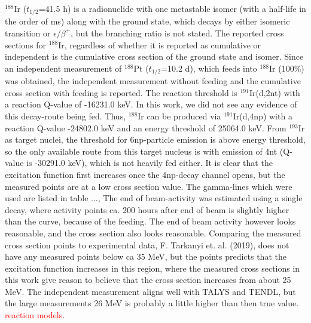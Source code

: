 \subsubsection{}
$^{188}$Ir ($t_{1/2}$=41.5 h) is a radionuclide with one metastable isomer (with a half-life in the order of ms) along with the ground state, which decays by either isomeric transition or $\epsilon/\beta^+$, but the branching ratio is not stated. The reported cross sections for $^{188}$Ir, regardless of whether it is reported as cumulative or independent is the cumulative cross section of the ground state and isomer. Since an independent measurement of $^{188}$Pt ($t_{1/2}$=10.2 d), which feeds into $^{188}$Ir (100\%) was obtained, the independent measurement without feeding and the cumulative cross section with feeding is reported. The reaction threshold is $^{191}$Ir(d,2nt) with a reaction Q-value of -16231.0 keV. In this work, we did not see any evidence of this decay-route being fed. Thus, $^{188}$Ir can be produced via $^{191}$Ir(d,4np) with a reaction Q-value -24802.0 keV and an energy threshold of 25064.0 keV. From $^{193}$Ir as target nuclei, the threshold for 6np-particle emission is above energy threshold, so the only available route from this target nucleus is with emission of 4nt (Q-value is -30291.0 keV), which is not heavily fed either. It is clear that the excitation function first increases once the 4np-decay channel opens, but the measured points are at a low cross section value. The gamma-lines which were used are listed in table ..., The end of beam-activity was estimated using a single decay, where activity points ca. 200 hours after end of beam is slightly higher than the curve, because of the feeding. The end of beam activity however looks reasonable, and the cross section also looks reasonable. Comparing the measured cross section points to experimental data, F. Tarkanyi et. al. (2019), does not have any measured points below ca 35 MeV, but the points predicts that the excitation function increases in this region, where the measured cross sections in this work give reason to believe that the cross section increases from about 25 MeV. The independent measurement aligns well with TALYS and TENDL, but the large measurements 26 MeV is probably a little higher than then true value. \textcolor{red}{reaction models}. 

